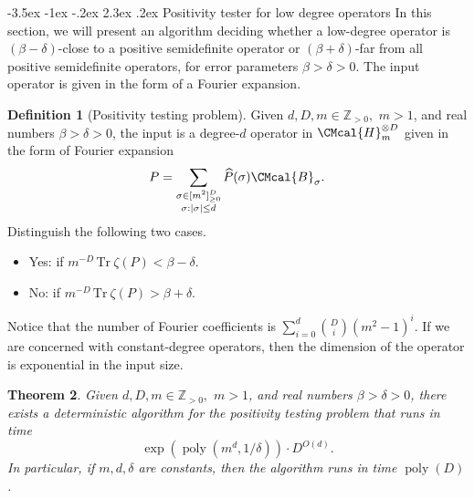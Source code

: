 \documentclass[10pt,a4paper]{article}
\makeatletter
\renewcommand{\section}{\@startsection {section}{1}{\z@}%
             {-3.5ex \@plus -1ex \@minus -.2ex}%
             {2.3ex \@plus .2ex}%
             {\normalfont\Large\scshape\bfseries}}
\def\B{\CMcal{B}}
\def\H{\CMcal{H}}
\theoremstyle{plain}
\newtheorem{theorem}{Theorem}[section]
\theoremstyle{definition}
\newtheorem{definition}[theorem]{Definition}
\newcommand {\br} [1] {\ensuremath{ \left( #1 \right) }}
\DeclarePairedDelimiter{\abs}{\lvert}{\rvert}
\newcommand {\Tr} {\ensuremath{ \mathrm{Tr} }}
\newcommand{\posint}{{\mathbb Z}_{>0}}
\newcommand{\herspace}[1]{\ensuremath{\H_m^{\otimes #1}}}
\newcommand{\poly} {\ensuremath{\operatorname{poly}}}
\newcommand{\dlbo} {\ensuremath{{D}}}
\newcommand{\1}{\mathbb{1}} %
\makeatother
\begin{document}
%
\section{Positivity tester for low degree operators}\label{sec:positivitytesting}
In this section, we will present an algorithm deciding whether a low-degree operator is $\br{\beta-\delta}$-close to a positive semidefinite operator or $\br{\beta+\delta}$-far from all positive semidefinite operators,
for error parameters $\beta>\delta>0$.
The input operator is given in the form of a Fourier expansion. 
\begin{definition}[Positivity testing problem]\label{def:postest}
Given $d, \dlbo, m\in\posint,$ $m>1$, and real numbers $\beta>\delta> 0$, the input is a degree-$d$ operator in $\herspace{\dlbo}$ given in the form of Fourier expansion
$$P=\sum_{\substack{\sigma\in[m^2]_{\ge 0}^\dlbo\\\sigma: \abs{\sigma}\le d}}\widehat{P}(\sigma)\B_\sigma.$$
Distinguish the following two cases.
\begin{itemize}
    \item Yes: if $m^{-\dlbo}\,\Tr~\zeta(P)<\beta-\delta$.
    \item No: if $m^{-\dlbo}\,\Tr~\zeta(P)>\beta+\delta$.
\end{itemize}
\end{definition}
Notice that the number of Fourier coefficients is $\sum_{i=0}^d{\binom{\dlbo}{i} }\br{m^2-1}^i$. If we are concerned with constant-degree operators, then the dimension of the operator is exponential in the input size.





\begin{theorem}\label{thm:psd-test}
  Given $d, \dlbo, m\in\posint,$ $m>1$, and real numbers $\beta>\delta> 0$,
there exists a deterministic algorithm for the positivity testing problem that runs in time
  $$\exp\br{\poly\br{m^d, 1/\delta}}\cdot \dlbo^{O(d)}.$$
  In particular, if $m,d,\delta$ are constants, then the algorithm runs in time $\poly(\dlbo)$.
\end{theorem}
\end{document}
